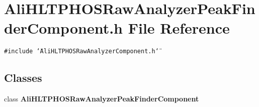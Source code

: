 \section{Ali\-HLTPHOSRaw\-Analyzer\-Peak\-Finder\-Component.h File Reference}
\label{AliHLTPHOSRawAnalyzerPeakFinderComponent_8h}


{\tt \#include \char`\"{}Ali\-HLTPHOSRaw\-Analyzer\-Component.h\char`\"{}}\par
\subsection*{Classes}
\begin{CompactItemize}
\item 
class {\bf Ali\-HLTPHOSRaw\-Analyzer\-Peak\-Finder\-Component}
\end{CompactItemize}
